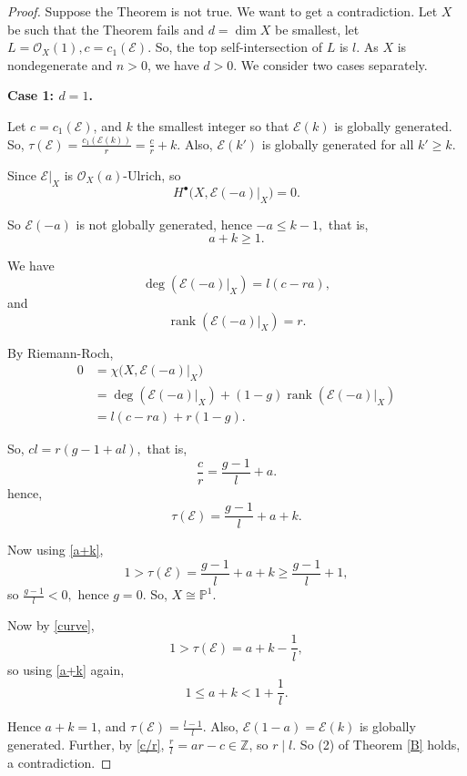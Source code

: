 \documentclass[11pt,letterpaper]{amsart}
\begin{document}
\begin{proof}
  Suppose the Theorem is not true. We want to get a contradiction. Let $X$ be such that the Theorem fails and $d=\dim X$ be smallest, let $L=\mathcal{O}_X(1), c=c_1(\mathcal{E}).$ So, the top self-intersection of  $L$ is $l.$ As $X$ is nondegenerate and $n>0$, we have $d>0.$
We consider two cases separately.
\noindent

\textbf{Case 1: $d=1$.}

Let $c=c_1(\mathcal{E})$, and $k$ the smallest integer so that $\mathcal{E}(k)$ is globally generated. So, $\tau(\mathcal{E})=\frac{c_1(\mathcal{E}(k))}{r}
=
\frac{c}{r}+k$.
Also, $\mathcal{E}(k')$  is globally generated for all $k'\ge k.$

Since $\mathcal{E}|_X$ is $\mathcal{O}_X(a)$-Ulrich, so
\[
H^{\bullet}\bigl(X,\mathcal{E}(-a)|_X\bigr)=0.
\]

So $\mathcal{E}(-a)$ is not globally generated, hence $-a\le k-1,$
that is,
\begin{equation}\label{a+k}
    a+k\ge 1.
\end{equation}

We have
\[
\deg(\mathcal{E}(-a)|_X)=l(c-ra),
\]
and
\[
\operatorname{rank}(\mathcal{E}(-a)|_X)=r.
\]

By Riemann-Roch,
\begin{align*}
0&=\chi\bigl(X,\mathcal{E}(-a)|_X\bigr)\\
&=
\deg(\mathcal{E}(-a)|_X)
+
(1-g)\operatorname{rank}(\mathcal{E}(-a)|_X)\\
&=l(c-ra)+r(1-g).
\end{align*}




So, $cl=r(g-1+al),$
that is,
\begin{equation}\label{c/r}
\frac{c}{r}
=
\frac{g-1}{l}+a.
\end{equation}
hence,
\begin{equation}\label{curve}
\tau(\mathcal E)
=
\frac{g-1}{l}+a+k.
\end{equation}

Now using \eqref{a+k},
\[
1>\tau(\mathcal E)
=
\frac{g-1}{l}+a+k
\ge
\frac{g-1}{l}+1,
\]
so $\frac{g-1}{l}<0,$ hence $g=0$. So, $X\cong \mathbb P^1$.

Now by \eqref{curve},
\[
1>\tau(\mathcal E)=a+k-\frac1l,
\]
so using \eqref{a+k} again,
\[
1\le a+k<1+\frac1l.
\]

Hence $a+k=1$, and $\tau(\mathcal E)=\frac{l-1}{l}.$ Also, $\mathcal E(1-a)=\mathcal E(k)$ is globally generated. Further, by \eqref{c/r}, $\frac{r}{l}=ar-c\in\mathbb{Z}$, so $r\mid l$.  So (2) of Theorem \ref{B} holds, a contradiction.


\end{proof}
\end{document}
